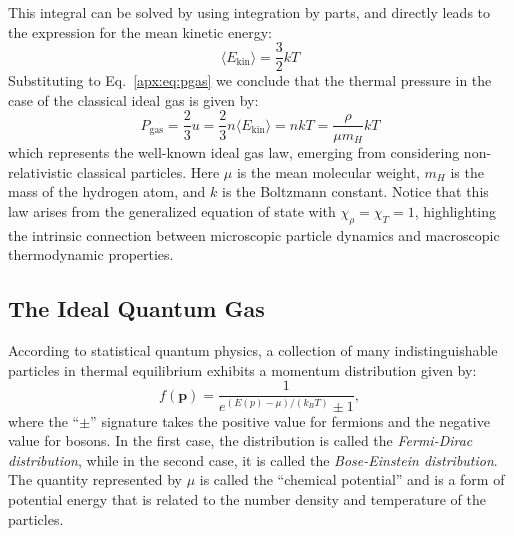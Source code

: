 \documentclass[main.tex]{subfiles}
\begin{document}
This integral can be solved by using integration by parts, and directly leads to the expression for the mean kinetic energy:
\begin{equation*}
    \langle E_\mathrm{kin} \rangle = \frac{3}{2}kT
\end{equation*}
Substituting to Eq.~\eqref{apx:eq:pgas} we conclude that the thermal pressure in the case of the classical ideal gas is given by:
\begin{equation}
    \boxed{P_{\text{gas}} = \frac{2}{3}u = \frac{2}{3} n \langle E_{\text{kin}} \rangle = nkT = \frac{\rho}{\mu m_H}kT}
\end{equation}
which represents the well-known ideal gas law, emerging from considering non-relativistic classical particles. Here $\mu$ is the mean molecular weight, $m_H$ is the mass of the hydrogen atom, and $k$ is the Boltzmann constant.
Notice that this law arises from the generalized equation of state with $\chi_\rho = \chi_T = 1$, highlighting the intrinsic connection between microscopic particle dynamics and macroscopic thermodynamic properties.



\subsection{The Ideal Quantum Gas}

According to statistical quantum physics, a collection of many indistinguishable particles in thermal equilibrium exhibits a momentum distribution given by:
    \begin{equation}
    f(\boldsymbol{p}) = \frac{1}{e^{(E(p) - \mu) / (k_B T)} \pm 1},
    \end{equation}
where the ``$\pm$'' signature takes the positive value for fermions and the negative value for bosons. In the first case, the distribution is called the \textit{Fermi-Dirac distribution}, while in the second case, it is called the \textit{Bose-Einstein distribution}. The quantity represented by $\mu$ is called the ``chemical potential'' and is a form of potential energy that is related to the number density and temperature of the particles.
\end{document}
